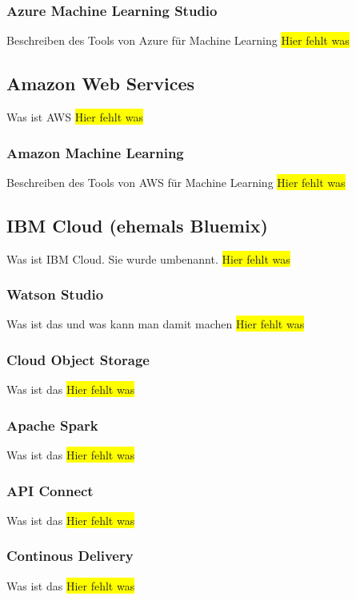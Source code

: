 \subsubsection{Azure Machine Learning Studio}
Beschreiben des Tools von Azure für Machine Learning
\colorbox{yellow}{Hier fehlt was}

\subsection{Amazon Web Services}
Was ist AWS
\colorbox{yellow}{Hier fehlt was}

\subsubsection{Amazon Machine Learning}
Beschreiben des Tools von AWS für Machine Learning
\colorbox{yellow}{Hier fehlt was}

\subsection{IBM Cloud (ehemals Bluemix)}
Was ist IBM Cloud. Sie wurde umbenannt.
\colorbox{yellow}{Hier fehlt was}

\subsubsection{Watson Studio}
Was ist das und was kann man damit machen
\colorbox{yellow}{Hier fehlt was}

\subsubsection{Cloud Object Storage}
Was ist das
\colorbox{yellow}{Hier fehlt was}

\subsubsection{Apache Spark}
Was ist das
\colorbox{yellow}{Hier fehlt was}

\subsubsection{API Connect}
Was ist das
\colorbox{yellow}{Hier fehlt was}

\subsubsection{Continous Delivery}
Was ist das
\colorbox{yellow}{Hier fehlt was}

